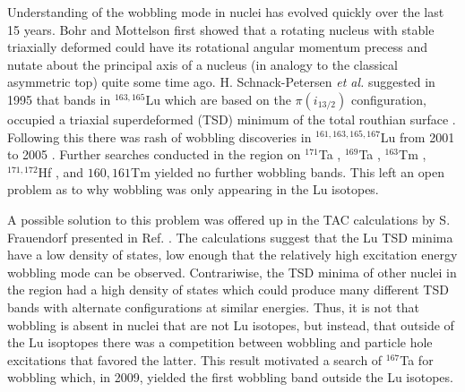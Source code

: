 Understanding of the wobbling mode in nuclei has evolved quickly over the last 15 years. Bohr and Mottelson first showed that a rotating nucleus with stable triaxially deformed could have its rotational angular momentum precess and nutate about the principal axis of a nucleus (in analogy to the classical asymmetric top) \cite{bohrMottelson2} quite some time ago. H. Schnack-Petersen \emph{et al.} suggested in 1995 that bands in $^{163,165}$Lu which are based on the $\pi{}(i_{13/2})$ configuration, occupied a triaxial superdeformed (TSD) minimum of the total routhian surface \cite{tsdLutetium}. Following this there was rash of wobbling discoveries in $^{161,163,165,167}$Lu from 2001 to 2005 \cite{wobblingIn163Lu,wobblingIn163LuTwoPhonon,wobblingIn165Lu,wobblingIn167Lu,wobblingIn161Lu}. Further searches conducted in the region on $^{171}$Ta \cite{wobbSearch171Ta}, $^{169}$Ta \cite{wobbSearch169Ta}, $^{163}$Tm \cite{wobbSearch163Tm}, $^{171,172}$Hf \cite{wobbSearch1712Hf}, and ${160,161}$Tm \cite{wobbSearch1601Tm} yielded no further wobbling bands. This left an open problem as to why wobbling was only appearing in the Lu isotopes.

A possible solution to this problem was offered up in the TAC calculations by S. Frauendorf presented in Ref. \cite{wobbSearch163Tm}. The calculations suggest that the Lu TSD minima have a low density of states, low enough that the relatively high excitation energy wobbling mode can be observed. Contrariwise, the TSD minima of other nuclei in the region had a high density of states which could produce many different TSD bands with alternate configurations at similar energies. Thus, it is not that wobbling is absent in nuclei that are not Lu isotopes, but instead, that outside of the Lu isoptopes there was a competition between wobbling and particle hole excitations that favored the latter. This result motivated a search of $^{167}$Ta for wobbling which, in 2009, yielded the first wobbling band outside the Lu isotopes.


